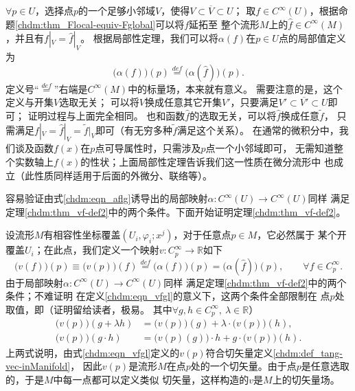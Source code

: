 $\forall p\in U$，选择点$p$的一个足够小邻域$V$，使得$V\subset \overline{V} \subset U$；
取$f\in C^\infty(U)$，根据命题\ref{chdm:thm_Flocal-equiv-Fglobal}可以将$f$延拓至
整个流形$M$上的$\hat{f}\in C^\infty(M)$，并且有$f|_V= \hat{f}|_V$。
根据局部性定理，我们可以将$\alpha(f)$在$p\in U$点的局部值定义为
\begin{equation}\label{chdm:eqn_aflg}
    \bigl(\alpha(f)\bigr)(p) \overset{def}{=} \bigl(\alpha(\hat{f})\bigr)(p) .
\end{equation}
定义号“$\overset{def}{=}$”右端是$C^\infty(M)$中的标量场，本来就有意义。
需要注意的是，这个定义与开集$V$选取无关；
可以将$V$换成任意其它开集$V'$，只要满足$V' \subset \overline{V'} \subset U$即可；
证明过程与上面完全相同。
也和函数$\hat{f}$的选取无关，可以将$\hat{f}$换成任意$\tilde{f}$，
只需满足$f|_V=\hat{f}|_V=\tilde{f}|_V$即可（有无穷多种$\tilde{f}$满足这个关系）。
在通常的微积分中，我们谈及函数$f(x)$在$p$点可导属性时，只需涉及$p$点一个小邻域即可，
无需知道整个实数轴上$f(x)$的性状；上面局部性定理告诉我们这一性质在微分流形中
也成立（此性质同样适用于后面的外微分、联络等）。

容易验证由式\eqref{chdm:eqn_aflg}诱导出的局部映射$\alpha:C^\infty(U)\to C^\infty(U)$同样
满足定理\ref{chdm:thm_vf-def2}中的两个条件。下面开始证明定理\ref{chdm:thm_vf-def2}。

设流形$M$有相容性坐标覆盖$(U_i,\varphi_i;x^j)$，对于任意点$p\in M$，它必然属于
某个开覆盖$U_i$；在此点，我们定义一个映射$v:C^\infty_p \to \mathbb{R}$如下
\begin{equation}\label{chdm:eqn_vfgl}
    \bigl(v(f)\bigr)(p) \equiv \bigl(v(p)\bigr)(f) \overset{def}{=} 
      \bigl(\alpha({f})\bigr)(p) =\bigl(\alpha(\hat{f})\bigr)(p) , \qquad \forall f\in C^\infty_p .
\end{equation}
由于局部映射$\alpha:C^\infty(U)\to C^\infty(U)$同样
满足定理\ref{chdm:thm_vf-def2}中的两个条件；不难证明
在定义\eqref{chdm:eqn_vfgl}的意义下，这两个条件全部限制在
点$p$处取值，即（证明留给读者，极易。
其中$\forall g,h \in C^\infty_p,\ \lambda \in \mathbb{R} $）
\begin{equation}\label{chdm:eqn_tmpvfg}
\begin{aligned}
    \bigl(v(p)\bigr) (g+\lambda h) &= \bigl(v(p)\bigr) (g) + \lambda\cdot \bigl(v(p)\bigr) (h) , \\
    \bigl(v(p)\bigr) (g\cdot h) &= \bigl(v(p)(g)\bigr) \cdot h + g\cdot\bigl(v(p)\bigr) ( h) .
\end{aligned}
\end{equation}
上两式说明，由式\eqref{chdm:eqn_vfgl}定义的$v(p)$符合切矢量定义\ref{chdm:def_tang-vec-inManifold}，
因此$v(p)$是流形$M$在点$p$处的一个切矢量。由于点$p$是任意选取的，于是$M$中每一点都可以定义类似
切矢量，这样构造的$v$是$M$上的{\kaishu 切矢量场}。

